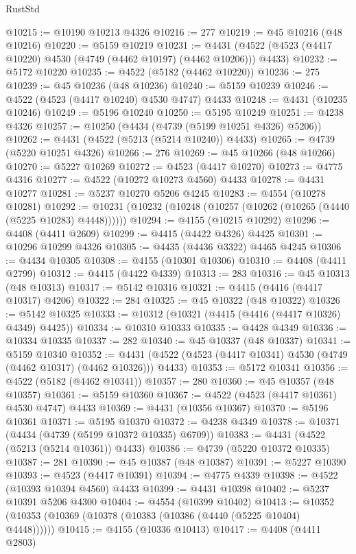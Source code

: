 \begin{lexlean}{RustStd}
\begin{coremodule}
{\begin{coremodule}
{{{{{{{{{{{{{{{{{{{{{{{{{{{{{{{{{{{{{{{{{{{{{{{{{{{{{{{{{{{{@10215 := @10190 @10213 @4326
@10216 := 277
@10219 := @45 @10216 (@48 @10216)
@10220 := @5159 @10219
@10231 := @4431 (@4522 (@4523 (@4417 @10220) @4530 (@4749 (@4462 @10197) (@4462 @10206))) @4433)
@10232 := @5172 @10220
@10235 := @4522 (@5182 (@4462 @10220))
@10236 := 275
@10239 := @45 @10236 (@48 @10236)
@10240 := @5159 @10239
@10246 := @4522 (@4523 (@4417 @10240) @4530 @4747) @4433
@10248 := @4431 (@10235 @10246)
@10249 := @5196 @10240
@10250 := @5195 @10249
@10251 := @4238 @4326
@10257 := @10250 (@4434 (@4739 (@5199 @10251 @4326) @5206))
@10262 := @4431 (@4522 (@5213 (@5214 @10240)) @4433)
@10265 := @4739 (@5220 @10251 @4326)
@10266 := 276
@10269 := @45 @10266 (@48 @10266)
@10270 := @5227 @10269
@10272 := @4523 (@4417 @10270)
@10273 := @4775 @4316
@10277 := @4522 (@10272 @10273 @4560) @4433
@10278 := @4431 @10277
@10281 := @5237 @10270 @5206 @4245
@10283 := @4554 (@10278 @10281)
@10292 := @10231 (@10232 (@10248 (@10257 (@10262 (@10265 (@4440 (@5225 @10283) @4448))))))
@10294 := @4155 (@10215 @10292)
@10296 := @4408 (@4411 @2609)
@10299 := @4415 (@4422 @4326) @4425
@10301 := @10296 @10299 @4326
@10305 := @4435 (@4436 @3322) @4465 @4245
@10306 := @4434 @10305
@10308 := @4155 (@10301 @10306)
@10310 := @4408 (@4411 @2799)
@10312 := @4415 (@4422 @4339)
@10313 := 283
@10316 := @45 @10313 (@48 @10313)
@10317 := @5142 @10316
@10321 := @4415 (@4416 (@4417 @10317) @4206)
@10322 := 284
@10325 := @45 @10322 (@48 @10322)
@10326 := @5142 @10325
@10333 := @10312 (@10321 (@4415 (@4416 (@4417 @10326) @4349) @4425))
@10334 := @10310 @10333
@10335 := @4428 @4349
@10336 := @10334 @10335
@10337 := 282
@10340 := @45 @10337 (@48 @10337)
@10341 := @5159 @10340
@10352 := @4431 (@4522 (@4523 (@4417 @10341) @4530 (@4749 (@4462 @10317) (@4462 @10326))) @4433)
@10353 := @5172 @10341
@10356 := @4522 (@5182 (@4462 @10341))
@10357 := 280
@10360 := @45 @10357 (@48 @10357)
@10361 := @5159 @10360
@10367 := @4522 (@4523 (@4417 @10361) @4530 @4747) @4433
@10369 := @4431 (@10356 @10367)
@10370 := @5196 @10361
@10371 := @5195 @10370
@10372 := @4238 @4349
@10378 := @10371 (@4434 (@4739 (@5199 @10372 @10335) @6709))
@10383 := @4431 (@4522 (@5213 (@5214 @10361)) @4433)
@10386 := @4739 (@5220 @10372 @10335)
@10387 := 281
@10390 := @45 @10387 (@48 @10387)
@10391 := @5227 @10390
@10393 := @4523 (@4417 @10391)
@10394 := @4775 @4339
@10398 := @4522 (@10393 @10394 @4560) @4433
@10399 := @4431 @10398
@10402 := @5237 @10391 @5206 @4300
@10404 := @4554 (@10399 @10402)
@10413 := @10352 (@10353 (@10369 (@10378 (@10383 (@10386 (@4440 (@5225 @10404) @4448))))))
@10415 := @4155 (@10336 @10413)
@10417 := @4408 (@4411 @2803)
}}}}}}}}}}}}}}}}}}}}}}}}}}}}}}}}}}}}}}}}}}}}}}}}}}}}}}}}}}}}
\end{coremodule}}
\end{coremodule}
\end{lexlean}
